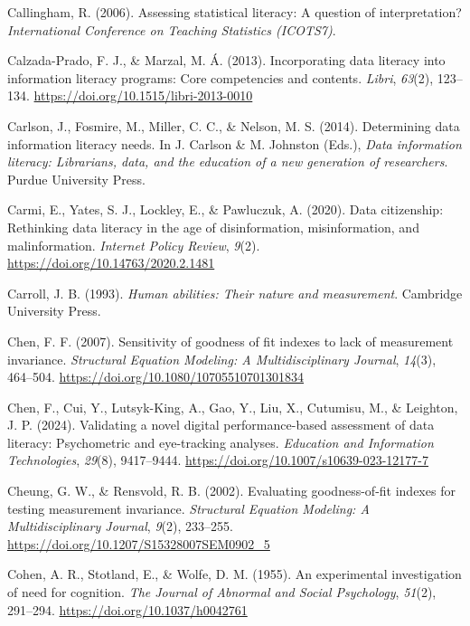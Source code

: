 \documentclass[
  12pt,
  a4paper,
  twoside]{article}
\newlength{\cslhangindent}
\newenvironment{CSLReferences}[2] %
 {\begin{list}{}{%
  \setlength{\itemindent}{0pt}
  \setlength{\leftmargin}{0pt}
  \setlength{\parsep}{0pt}
  \ifodd #1
   \setlength{\leftmargin}{\cslhangindent}
   \setlength{\itemindent}{-1\cslhangindent}
  \fi
  \setlength{\itemsep}{#2\baselineskip}}}
 {\end{list}}
\begin{document}
\begin{CSLReferences}{1}{0}
Callingham, R. (2006). Assessing statistical literacy: A question of interpretation? \emph{International Conference on Teaching Statistics (ICOTS7)}.

Calzada-Prado, F. J., \& Marzal, M. Á. (2013). Incorporating data literacy into information literacy programs: Core competencies and contents. \emph{Libri}, \emph{63}(2), 123--134. \url{https://doi.org/10.1515/libri-2013-0010}

Carlson, J., Fosmire, M., Miller, C. C., \& Nelson, M. S. (2014). Determining data information literacy needs. In J. Carlson \& M. Johnston (Eds.), \emph{Data information literacy: Librarians, data, and the education of a new generation of researchers}. Purdue University Press.

Carmi, E., Yates, S. J., Lockley, E., \& Pawluczuk, A. (2020). Data citizenship: Rethinking data literacy in the age of disinformation, misinformation, and malinformation. \emph{Internet Policy Review}, \emph{9}(2). \url{https://doi.org/10.14763/2020.2.1481}

Carroll, J. B. (1993). \emph{Human abilities: Their nature and measurement}. Cambridge University Press.

Chen, F. F. (2007). Sensitivity of goodness of fit indexes to lack of measurement invariance. \emph{Structural Equation Modeling: A Multidisciplinary Journal}, \emph{14}(3), 464--504. \url{https://doi.org/10.1080/10705510701301834}

Chen, F., Cui, Y., Lutsyk-King, A., Gao, Y., Liu, X., Cutumisu, M., \& Leighton, J. P. (2024). Validating a novel digital performance-based assessment of data literacy: Psychometric and eye-tracking analyses. \emph{Education and Information Technologies}, \emph{29}(8), 9417--9444. \url{https://doi.org/10.1007/s10639-023-12177-7}

Cheung, G. W., \& Rensvold, R. B. (2002). Evaluating goodness-of-fit indexes for testing measurement invariance. \emph{Structural Equation Modeling: A Multidisciplinary Journal}, \emph{9}(2), 233--255. \url{https://doi.org/10.1207/S15328007SEM0902_5}

Cohen, A. R., Stotland, E., \& Wolfe, D. M. (1955). An experimental investigation of need for cognition. \emph{The Journal of Abnormal and Social Psychology}, \emph{51}(2), 291--294. \url{https://doi.org/10.1037/h0042761}


\end{CSLReferences}
\end{document}
